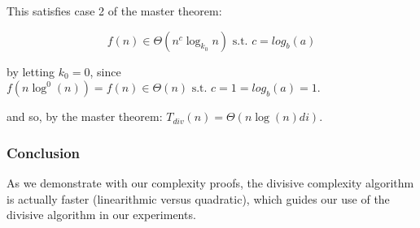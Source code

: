 \documentclass[../tech_report_1.tex]{subfiles}
\begin{document}
This satisfies case 2 of the master theorem:

$$ f(n) \in \Theta(n^c\log_{k_{0}}n) \text{ s.t. } c = log_b(a) $$

by letting $k_0=0$, since $f(n\log^0(n)) = f(n) \in \Theta(n) \text{ s.t. } c = 1 = log_b(a) = 1$.

and so, by the master theorem: $ T_{div}(n) = \Theta(n\log(n)di)$. \qedsymbol

\subsubsection{Conclusion}

As we demonstrate with our complexity proofs, the divisive complexity algorithm is actually faster (linearithmic versus quadratic), which guides our use of the divisive algorithm in our experiments.
\end{document}
